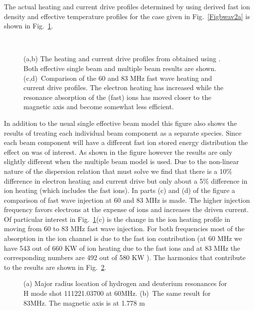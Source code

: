  The actual heating and current drive profiles determined by using \ot
 derived fast ion density and effective temperature profiles for the
 case given in 
 Fig.~\ref{Figbwav2a} is  shown in Fig.~\ref{Figbwav3a}. 
 \begin{figure} %
 \centering 
 \begin{narrow}{-.50in}{0in}   
 \mbox{}
 \\[20pt]
 \mbox{}
 \end{narrow}
 \caption{(a,b) The heating and current drive profiles from \ct obtained
   using \ot. Both effective single beam and multiple beam results are
   shown.
    (c,d)~Comparison of the 60 and 83 MHz fast wave heating and current
    drive profiles. The electron heating has increased
    while the resonance absorption of the (fast) ions has moved closer to
    the magnetic axis and become somewhat less efficient.}
  \label{Figbwav3a}
 \end{figure}
 In addition to the usual
 single effective beam model this figure also shows the results of
 treating each individual beam component  as a separate species. Since
 each beam component will have a different fast ion stored energy
 distribution the effect on \ct was of interest. As shown in the
 figure however the results are only slightly  different when the
 multiple beam model is used. Due to the non-linear nature of the
 dispersion relation that \ct must solve we find that there is a 10\%
 difference in electron heating and current drive but only about a 5\%
 difference in ion heating (which includes the fast ions). In parts
 (c) and (d) of the figure a comparison of fast wave injection at 60
 and 83 MHz is made. The higher injection frequency favors electrons
 at the expense of ions and increases the driven current.  Of
 particular interest in Fig.~\ref{Figbwav3a}(c) is the change in the ion
 heating profile in moving from 60 to 83 MHz fast wave injection.
 For both frequencies most of the absorption in the ion channel is
 due to the fast ion contribution (at 60 MHz we have 543 out of 660 KW
 of ion heating due to the fast ions and at 83 MHz the corresponding
 numbers are 492 out of 580 KW ). The harmonics that contribute to the
 results are shown in Fig.~\ref{h1}. 
 \begin{figure} %
 \centering 
\begin{narrow}{-.50in}{0in}   
 \mbox{}
 \end{narrow}
 \caption{(a) Major radius location of hydrogen and  deuterium
   resonances for H mode shot 111221.03700  at 60MHz. 
    (b)~The same result for 83MHz. The magnetic axis is at 1.778 m}
  \label{h1}
 \end{figure}
